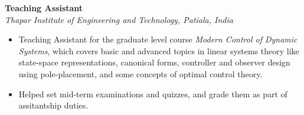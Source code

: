 \vspace{0.1 in}

\large{\textbf{Teaching Assistant}}
\hfill
\thapardate\\
\emph{\large{Thapar Institute of Engineering and Technology, Patiala, India}}
\begin{itemize}
	\item Teaching Assistant for the graduate level course \emph{Modern Control of Dynamic Systems}, which covers basic and advanced topics in linear systems theory like state-space representations, canonical forms, controller and observer design using pole-placement, and some concepts of optimal control theory.
	\item Helped set mid-term examinations and quizzes, and grade them as part of assitantship duties.
\end{itemize}



